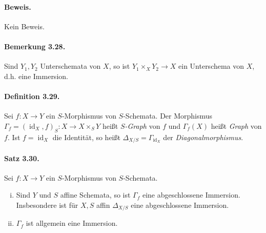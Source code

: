 \documentclass[11pt,b5paper,openany]{memoir}
\begin{document}
\paragraph{Beweis.} Kein Beweis.

\paragraph{Bemerkung 3.28.}\label{3.28} Sind $Y_1,Y_2$ Unterschemata von $X$, so ist $Y_1\times_XY_2\to X$ ein Unterschema von $X$, d.h. eine Immersion.

\paragraph{Definition 3.29.}\label{3.29} Sei $f:X\to Y$ ein $S$-Morphismus von $S$-Schemata. Der Morphismus $\Gamma_f=(\operatorname{id}_X,f)_S:X\to X\times_SY$ heißt \textit{$S$-Graph} von $f$ und $\Gamma_f(X)$ heißt \textit{Graph} von $f$. Ist $f=\operatorname{id}_X$ die Identität, so heißt $\Delta_{X/S}=\Gamma_{\operatorname{id}_X}$ der \textit{Diagonalmorphismus}.

\paragraph{Satz 3.30.}\label{3.30} Sei $f:X\to Y$ ein $S$-Morphismus von $S$-Schemata. \begin{enumerate}[(i)]
\item Sind $Y$ und $S$ affine Schemata, so ist $\Gamma_f$ eine abgeschlossene Immersion. Insbesondere ist für $X,S$ affin $\Delta_{X/S}$ eine abgeschlossene Immersion.
\item $\Gamma_f$ ist allgemein eine Immersion.
\end{enumerate}
\end{document}
